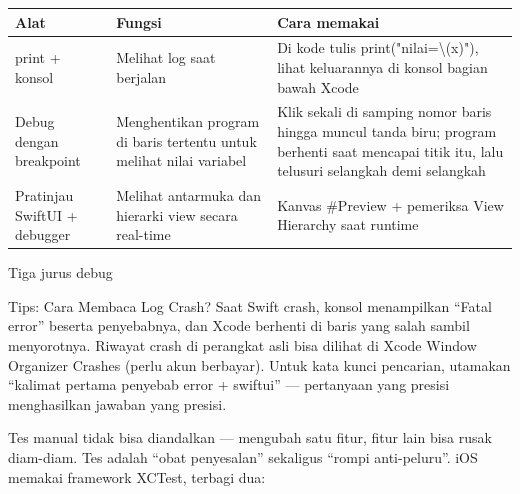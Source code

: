 


\begin{center}
\begin{tabularx}{\linewidth}{|X|X|X|}
\hline
\textbf{Alat} & \textbf{Fungsi} & \textbf{Cara memakai} \tabularnewline
\hline
print + konsol & Melihat log saat berjalan & Di kode tulis print("nilai=\textbackslash{}(x)"), lihat keluarannya di konsol bagian bawah Xcode \tabularnewline
Debug dengan breakpoint & Menghentikan program di baris tertentu untuk melihat nilai variabel & Klik sekali di samping nomor baris hingga muncul tanda biru; program berhenti saat mencapai titik itu, lalu telusuri selangkah demi selangkah \tabularnewline
Pratinjau SwiftUI + debugger & Melihat antarmuka dan hierarki view secara real-time & Kanvas \#Preview + pemeriksa View Hierarchy saat runtime \tabularnewline
\hline
\end{tabularx}
\end{center}

\begin{center}\small\color{gray}Tiga jurus debug\end{center}

\begin{tcbinfo}{Tips: Cara Membaca Log Crash?}
Saat Swift crash, konsol menampilkan “Fatal error” beserta penyebabnya, dan Xcode berhenti di baris yang salah sambil menyorotnya. Riwayat crash di perangkat asli bisa dilihat di Xcode Window Organizer Crashes (perlu akun berbayar). Untuk kata kunci pencarian, utamakan “kalimat pertama penyebab error + swiftui” — pertanyaan yang presisi menghasilkan jawaban yang presisi.

\end{tcbinfo}


Tes manual tidak bisa diandalkan — mengubah satu fitur, fitur lain bisa rusak diam-diam. Tes adalah “obat penyesalan” sekaligus “rompi anti-peluru”. iOS memakai framework XCTest, terbagi dua:

